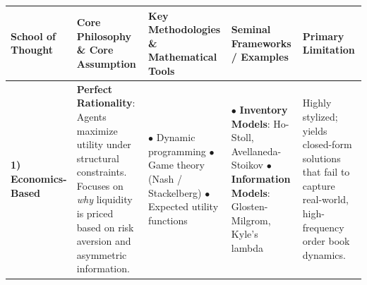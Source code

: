 \documentclass[12pt,a4paper]{cau_thesis}
\begin{document}
\begin{table}[htbp]
    \centering
    \scriptsize %
    \begin{tabularx}{\textwidth}{l >{\raggedright\arraybackslash}X >{\raggedright\arraybackslash}X >{\raggedright\arraybackslash}X >{\raggedright\arraybackslash}X}
        \toprule
        \textbf{School of Thought}                                                                                                                                                         & \textbf{Core Philosophy \& Core Assumption} & \textbf{Key Methodologies \& Mathematical Tools} & \textbf{Seminal Frameworks / Examples} & \textbf{Primary Limitation} \\
        \midrule

        \textbf{1) Economics-Based}                                                                                                                                                        &
        \textbf{Perfect Rationality}: Agents maximize utility under structural constraints. Focuses on \textit{why} liquidity is priced based on risk aversion and asymmetric information. &
        $\bullet$ Dynamic programming \newline $\bullet$ Game theory (Nash / Stackelberg) \newline $\bullet$ Expected utility functions                                                    &
        $\bullet$ \textbf{Inventory Models}: Ho-Stoll, Avellaneda-Stoikov \newline $\bullet$ \textbf{Information Models}: Glosten-Milgrom, Kyle's lambda                                   &
        Highly stylized; yields closed-form solutions that fail to capture real-world, high-frequency order book dynamics.                                                                                                                                                                                                                                         \\
        \midrule


\end{tabularx}
\end{table}
\end{document}
